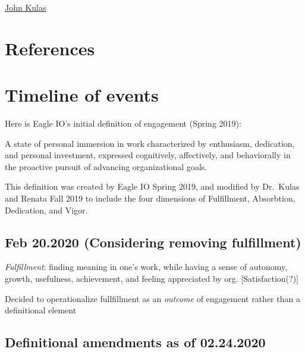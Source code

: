 \documentclass[
]{book}
\begin{document}
\href{mailto:kulasj@montclair.edu}{John Kulas}

\hypertarget{references}{%
\chapter{References}\label{references}}

\citet{eagly_psychology_1993}
\citeauthor{simpson_engagement_2009} \citetext{\citeyear{simpson_engagement_2009}; \citealp{harter_business_2002}; \citealp{kahn_psychological_1990}; \citealp{leiter_areas_2003}; \citealp{R-base}; \citealp{R-rmarkdown}; \citealp{rothbard_enriching_2001}; \citealp{saks_antecedents_2006}; \citealp{schaufeli_measurement_2002}; \citealp{simpson_engagement_2009}}

\hypertarget{refs}{}

\hypertarget{appendix-appendices}{%
\appendix}


\hypertarget{timeline-of-events}{%
\chapter{Timeline of events}\label{timeline-of-events}}

Here is Eagle IO's initial definition of engagement (Spring 2019):

A state of personal immersion in work characterized by enthusiasm, dedication, and personal investment, expressed cognitively, affectively, and behaviorally in the proactive pursuit of advancing organizational goals.

This definition was created by Eagle IO Spring 2019, and modified by Dr.~Kulas and Renata Fall 2019 to include the four dimensions of Fulfillment, Absorbtion, Dedication, and Vigor.

\hypertarget{feb-20.2020-considering-removing-fulfillment}{%
\section{Feb 20.2020 (Considering removing fulfillment)}\label{feb-20.2020-considering-removing-fulfillment}}

\emph{Fulfillment}: finding meaning in one's work, while having a sense of autonomy, growth, usefulness, achievement, and feeling appreciated by org. {[}Satisfaction(?){]}

Decided to operationalize fullfillment as an \emph{outcome} of engagement rather than a definitional element

\hypertarget{definitional-amendments-as-of-02.24.2020}{%
\section{Definitional amendments as of 02.24.2020}\label{definitional-amendments-as-of-02.24.2020}}
\end{document}
